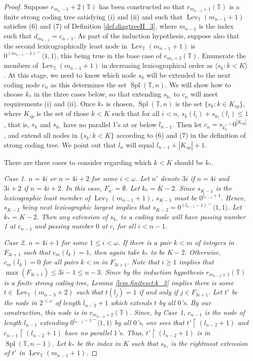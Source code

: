 \documentclass{amsart}
\theoremstyle{remark}
\theoremstyle{definition}
\theoremstyle{remark}
\newcommand{\om}{\omega}
\DeclareMathOperator{\Spl}{Spl}
\DeclareMathOperator{\Lev}{Lev}
\newcommand{\re}{\restriction}
\newcommand{\bT}{\mathbb{T}}
\newcommand{\lgl}{\langle}
\newcommand{\rgl}{\rangle}
\begin{document}
\begin{proof}
Suppose $r_{m_n-1}+2(\bT)$ has been constructed
 so that
$r_{m_{n-1}+1}(\bT)$
 is a finite   strong coding tree
 satisfying (i)  and  (ii)
and such that $\Lev_{\bT}(m_{n-1}+1)$ satisfies (6) and (7)  of Definition \ref{def.diagtreeH_3},
where $m_{n-1}$ is the index such that $d_{m_{n-1}}=c_{n-1}$.
As part of the induction hypothesis, suppose also that the second lexicographically least node in $\Lev_{\bT}(m_{n-1}+1)$ is ${0^{(m_{n-1}-1)}}^{\frown}\lgl 1,1\rgl$,
this being true in the base case of $r_{m_1+2}(\bT)$.
Enumerate the members of $\Lev_{\bT}(m_{n-1}+1)$  in decreasing lexicographical order as $\lgl s_k:k<K\rgl$.
At this stage, we need to know which node $s_k$ will be extended to the next coding node $c_n$ as this determines the set $\Spl(\bT,n)$.
We will show how to choose $k_*$ in the three cases below, so that  extending $s_{k_*}$ to $c_n$   will meet
requirements (i)  and  (ii).
Once $k_*$ is chosen,
 $\Spl(\bT,n)$  is  the set  $\{s_k:k\in K_{sp}\}$,
where
 $K_{sp}$ is the set of those $k<K$ such that
for all $i<n$, $s_k(l_i)+s_{k_*}(l_i)\le 1$,
that is, $s_k$ and $s_{k_*}$ have no parallel $1$'s at or  below $l_{n-1}$.
Then let $c_n={s_{k_n^*}}^{\frown}0^{|K_{sp}|}$,
and extend all nodes in $\{s_k:k<K\}$ according to (6) and (7) in the definition of strong coding tree.
We point out that  $l_n$ will equal $l_{n-1}+|K_{sp}|+1$.



There are three cases  to consider regarding which $k<K$ should be $k_*$.


\it Case 1. \rm $n=4i$ or $n=4i+2$ for some $i<\om$.
Let $n'$ denote $3i$ if $n=4i$ and  $3i+2$ if $n=4i+2$.
In this case, $F_{n'}=\emptyset$.
Let $k_*=K-2$.
Since $s_{K-1}$ is the lexicographic least member of $\Lev_{\bT}(m_{n-1}+1)$, $s_{K-1}$ must be $0^{l_{n-1}+1}$.
Hence,
$s_{K-2}$ being  next lexicographic largest implies that $s_{K-2}={0^{(l_{n-1}-1)}}^{\frown}\lgl 1,1\rgl$.
Let $k_*=K-2$.
Then any extension of $s_{k_*}$ to a coding  node will have passing number 1 at  $c_{n-1}$ and  passing number $0$ at  $c_i$ for all  $i<n-1$.


\it Case 2. \rm $n=4i+1$ for some $1\le i  <\om$.
If there is a pair $k<m$ of integers in $F_{3i+1}$ such that $c_m(l_k)=1$,
then again take $k_*$ to be $K-2$.
Otherwise,
 $c_m(l_k)=0$
for all pairs $k<m$ in $F_{3i+1}$.
Note that $i\ge 1 $ implies that
$\max(F_{3i+1})\le 3i-1\le n-3$.
Since by the induction hypothesis $r_{m_{n-2}+1}(\bT)$ is a finite strong coding tree,
Lemma \ref{lem.finitesctA_3}
implies
there is some $t\in \Lev_{\bT}(m_{n-3}+2)$
such that $t(l_j)=1$ if and only if $j\in F_{3i+1}$.
Let $t'$ be the node in  $2^{<\om}$ of length
$l_{n-2}+1$ which extends $t$ by all $0$'s.
By our construction, this node is in $r_{m_{n-2}+2}(\bT)$.
Since,  by Case 1,
$c_{n-1}$ is the node of length $l_{n-1}$ extending ${0^{l_{n-2}-1}}^{\frown}\lgl 1,1\rgl$ by all $0$'s, one sees that
$t'\re (l_{n-2}+1)$ and $c_{n-1}\re(l_{n-2}+1)$ have no parallel $1$'s.
Thus, $t'\re (l_{n-2}+1)$  is in $\Spl(\bT, n-1)$.
Let $k_*$ be the index in $K$ such that
$s_{k_*}$ is
 the rightmost extension of $t'$
in $\Lev_{\bT}(m_{n-1}+1)$.




\end{proof}
\end{document}
